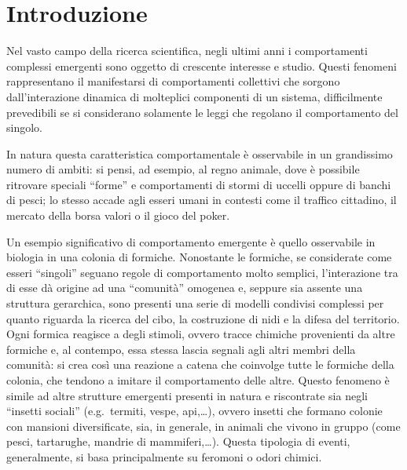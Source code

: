 \chapter{Introduzione}\label{chap:introduzione}

Nel vasto campo della ricerca scientifica, negli ultimi anni i comportamenti complessi emergenti sono oggetto di 
crescente interesse e studio. Questi fenomeni rappresentano il manifestarsi di comportamenti collettivi che sorgono
dall'interazione dinamica di molteplici componenti di un sistema, difficilmente prevedibili se si considerano solamente 
le leggi che regolano il comportamento del singolo. 

In natura questa caratteristica comportamentale è osservabile in un grandissimo numero di ambiti: si pensi, ad esempio, al regno 
animale, dove è possibile ritrovare speciali ``forme'' e comportamenti di stormi di uccelli oppure di banchi di pesci; lo stesso accade 
agli esseri umani in contesti come il traffico cittadino, il mercato della borsa valori o il gioco del poker.

Un esempio significativo di comportamento emergente è quello osservabile in biologia in una colonia di formiche. Nonostante le formiche, se considerate 
come esseri ``singoli'' seguano regole di comportamento molto semplici,
l'interazione tra di esse dà origine ad una ``comunità'' omogenea e, seppure sia assente una struttura gerarchica, sono presenti una serie di modelli condivisi
complessi per quanto riguarda la ricerca del cibo, la costruzione di nidi e la difesa del territorio.
Ogni formica reagisce a degli stimoli, ovvero tracce chimiche provenienti da altre formiche e, al contempo, essa stessa lascia segnali agli altri membri
della comunità: si crea così una reazione a catena che coinvolge tutte le formiche della colonia, che tendono a imitare il comportamento delle altre.
Questo fenomeno è simile ad altre strutture emergenti presenti in natura e riscontrate sia negli ``insetti sociali'' (e.g.\ termiti, vespe, api,\dots),
ovvero insetti che formano colonie con mansioni diversificate, sia, in generale, in animali che vivono in gruppo 
(come pesci, tartarughe, mandrie di mammiferi,\ldots). Questa tipologia di eventi, generalmente, si basa principalmente su feromoni o odori chimici.

